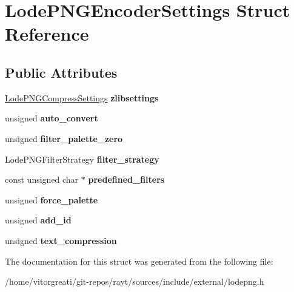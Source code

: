 \hypertarget{struct_lode_p_n_g_encoder_settings}{}\section{Lode\+P\+N\+G\+Encoder\+Settings Struct Reference}
\label{struct_lode_p_n_g_encoder_settings}
\subsection*{Public Attributes}
\begin{DoxyCompactItemize}
\item 
\mbox{\label{struct_lode_p_n_g_encoder_settings_a2c5928b4172c75e27de467870f2ff946}} 
\mbox{\hyperlink{struct_lode_p_n_g_compress_settings}{Lode\+P\+N\+G\+Compress\+Settings}} {\bfseries zlibsettings}
\item 
\mbox{\label{struct_lode_p_n_g_encoder_settings_a1203b8db6532c9ff4a5c8ee692cd327a}} 
unsigned {\bfseries auto\+\_\+convert}
\item 
\mbox{\label{struct_lode_p_n_g_encoder_settings_a0d82e8f2fabcb6cebbc54b80922945f1}} 
unsigned {\bfseries filter\+\_\+palette\+\_\+zero}
\item 
\mbox{\label{struct_lode_p_n_g_encoder_settings_a5e18e4eb941763a2e3e6c65ee9f0729c}} 
Lode\+P\+N\+G\+Filter\+Strategy {\bfseries filter\+\_\+strategy}
\item 
\mbox{\label{struct_lode_p_n_g_encoder_settings_a4446f87b5283f25664802a1be037e76e}} 
const unsigned char $\ast$ {\bfseries predefined\+\_\+filters}
\item 
\mbox{\label{struct_lode_p_n_g_encoder_settings_a04dc9622ccd1d7c74c56291409aa512a}} 
unsigned {\bfseries force\+\_\+palette}
\item 
\mbox{\label{struct_lode_p_n_g_encoder_settings_a893aa542aa7c122c32ee36dd716fbcb2}} 
unsigned {\bfseries add\+\_\+id}
\item 
\mbox{\label{struct_lode_p_n_g_encoder_settings_a6ffdcb8e85a65ea208fe027be072d710}} 
unsigned {\bfseries text\+\_\+compression}
\end{DoxyCompactItemize}


The documentation for this struct was generated from the following file\+:\begin{DoxyCompactItemize}
\item 
/home/vitorgreati/git-\/repos/rayt/sources/include/external/lodepng.\+h\end{DoxyCompactItemize}

